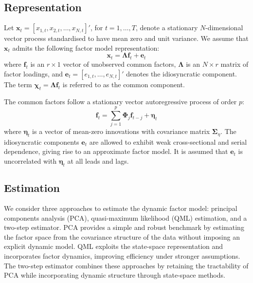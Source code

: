 \subsection{Representation}\label{representation}

Let $\boldsymbol{x}_t = [x_{1,t}, x_{2,t}, \dots, x_{N,t}]'$, for $t = 1, \dots, T$, denote a stationary $N$-dimensional vector process standardised to have mean zero and unit variance. We assume that $\boldsymbol{x}_t$ admits the following factor model representation:
\begin{equation}
\boldsymbol{x}_t = \boldsymbol{\Lambda} \boldsymbol{f}_t + \boldsymbol{e}_t
\end{equation}
where $\boldsymbol{f}_t$ is an $r \times 1$ vector of unobserved common factors, $\boldsymbol{\Lambda}$ is an $N \times r$ matrix of factor loadings, and $\boldsymbol{e}_t = [e_{1,t}, \dots, e_{N,t}]'$ denotes the idiosyncratic component. The term $\boldsymbol{\chi}_t = \boldsymbol{\Lambda} \boldsymbol{f}_t$ is referred to as the common component.

The common factors follow a stationary vector autoregressive process of order $p$:
\begin{equation}
\boldsymbol{f}_t = \sum_{j=1}^{p} \boldsymbol{\Phi}_j \boldsymbol{f}_{t-j} + \boldsymbol{\eta}_t
\end{equation}
where $\boldsymbol{\eta}_t$ is a vector of mean-zero innovations with covariance matrix $\boldsymbol{\Sigma}_{\eta}$. The idiosyncratic components $\boldsymbol{e}_t$ are allowed to exhibit weak cross-sectional and serial dependence, giving rise to an approximate factor model. It is assumed that $\boldsymbol{e}_t$ is uncorrelated with $\boldsymbol{\eta}_t$ at all leads and lags.

\subsection{Estimation}

We consider three approaches to estimate the dynamic factor model: principal components analysis (PCA), quasi-maximum likelihood (QML) estimation, and a two-step estimator. PCA provides a simple and robust benchmark by estimating the factor space from the covariance structure of the data without imposing an explicit dynamic model. QML exploits the state-space representation and incorporates factor dynamics, improving efficiency under stronger assumptions. The two-step estimator combines these approaches by retaining the tractability of PCA while incorporating dynamic structure through state-space methods.

